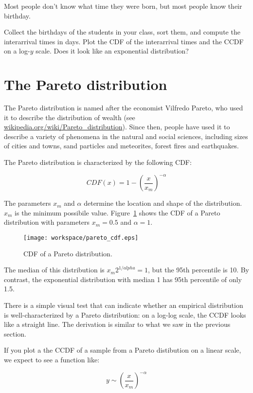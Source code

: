 \documentclass[10pt]{book}
\begin{document}
\begin{ex}
Most people don't know what time they were born, but most people know
their birthday.

Collect the birthdays of the students in your class, sort them, and
compute the interarrival times in days.  Plot the CDF of the interarrival
times and the CCDF on a log-$y$ scale.  Does it look like
an exponential distribution?
\end{ex}


\section{The Pareto distribution}

The Pareto distribution is named after the economist Vilfredo Pareto,
who used it to describe the distribution of wealth (see
\url{wikipedia.org/wiki/Pareto_distribution}).  Since then, people
have used it to describe a variety of phenomena in the natural and
social sciences, including sizes of cities and towns, sand particles
and meteorites, forest fires and earthquakes.

The Pareto distribution is characterized by the following CDF:

\[ CDF(x) = 1- \left( \frac{x}{x_m} \right) ^{-\alpha} \]

The parameters $x_m$ and $\alpha$ determine the location and shape of
the distribution.  $x_m$ is the minimum possibile value.
Figure~\ref{pareto_cdf} shows the CDF of a Pareto distribution with
parameters $x_m = 0.5$ and $\alpha = 1$.

\begin{figure}
\centerline{\texttt{[image: workspace/pareto\_cdf.eps]}}
\caption{CDF of a Pareto distribution.}
\label{pareto_cdf}
\end{figure}

The median of this distribution is $x_m 2^{1/alpha} = 1$, but the
95th percentile is 10.  By contrast, the exponential distribution
with median 1 has 95th percentile of only 1.5.

There is a simple visual test that can indicate whether an empirical
distribution is well-characterized by a Pareto distribution: on a
log-log scale, the CCDF looks like a straight line.  The derivation is
similar to what we saw in the previous section.

If you plot a the CCDF of a sample from a Pareto distibution on a
linear scale, we expect to see a function like:

\[ y \sim \left( \frac{x}{x_m} \right) ^{-\alpha} \]
\end{document}
